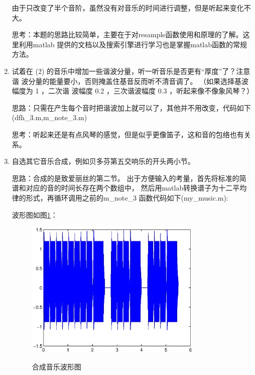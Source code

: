 \documentclass{ctexart}
\begin{document}
\begin{enumerate}
        由于只改变了半个音阶，虽然没有对音乐的时间进行调整，但是听起来变化不大。

        思考：本题的思路比较简单，主要在于对resample函数使用和原理的了解。这里利用matlab 提供的文档以及搜索引擎进行学习也是掌握matlab函数的常规方法。

    \item{
            试着在 (2) 的音乐中增加一些谐波分量，听一听音乐是否更有“厚度”了？注意谐
            波分量的能量要小，否则掩盖住基音反而听不清音调了。 （如果选择基波幅度为 1 ，二次谐
            波幅度 0.2 ，三次谐波幅度 0.3 ，听起来像不像象风琴？）
        }

        思路：只需在产生每个音时把谐波加上就可以了，其他并不用改变，代码如下(dfh\_3.m,m\_note\_3.m)
        
        

        思考：听起来还是有点风琴的感觉，但是似乎更像笛子，这和音的包络也有关系。

    \item{
        自选其它音乐合成，例如贝多芬第五交响乐的开头两小节。}

        思路：合成的是致爱丽丝的第二节。
        出于方便输入的考量，首先将标准的简谱和对应的音的时间长存在两个数组中，
        然后用matlab转换谱子为十二平均律的形式，再循环调用之前的m\_note\_3 函数代码如下(my\_music.m):
        

        波形图如图\ref{15}：
        \begin{figure}
            \centering
            \includegraphics[width=0.8\textwidth]{dfh/1_5.eps}\\
            \caption{合成音乐波形图\label{15}}
        \end{figure}
\end{enumerate}
\end{document}
